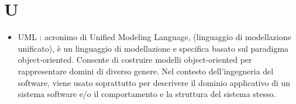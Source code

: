 % 
%
% 
%

\section{U}

\begin{itemize}

	\item UML : acronimo di Unified Modeling Language, (linguaggio di modellazione unificato), è un linguaggio di modellazione e specifica basato sul paradigma object-oriented. Consente di costruire modelli object-oriented per rappresentare domini di diverso genere. Nel contesto dell’ingegneria del software, viene usato soprattutto per descrivere il dominio applicativo di un sistema software e/o il comportamento e la struttura del sistema stesso.



\end{itemize}
